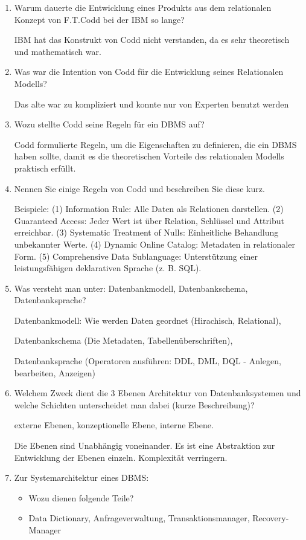 \documentclass[a4paper]{article}
\begin{document}
\begin{enumerate}
    Im Netzwerkmodell wurden Beziehungen explizit durch Zeiger/Links zwischen Datensätzen realisiert, so dass komplexere Verknüpfungen als nur Baumstrukturen möglich waren.
    \item Warum dauerte die Entwicklung eines Produkts aus dem relationalen Konzept von F.T.Codd bei der IBM so lange?
    
    IBM hat das Konstrukt von Codd nicht verstanden, da es sehr theoretisch und mathematisch war.
    \item Was war die Intention von Codd für die Entwicklung seines Relationalen Modells?
    
    Das alte war zu kompliziert und konnte nur von Experten benutzt werden
    \item Wozu stellte Codd seine Regeln für ein DBMS auf?
    
    Codd formulierte Regeln, um die Eigenschaften zu definieren, die ein DBMS haben sollte, damit es die theoretischen Vorteile des relationalen Modells praktisch erfüllt.
    \item Nennen Sie einige Regeln von Codd und beschreiben Sie diese kurz.
    
    Beispiele: (1) Information Rule: Alle Daten als Relationen darstellen. (2) Guaranteed Access: Jeder Wert ist über Relation, Schlüssel und Attribut erreichbar. (3) Systematic Treatment of Nulls: Einheitliche Behandlung unbekannter Werte. (4) Dynamic Online Catalog: Metadaten in relationaler Form. (5) Comprehensive Data Sublanguage: Unterstützung einer leistungsfähigen deklarativen Sprache (z. B. SQL).
    \item Was versteht man unter: Datenbankmodell, Datenbankschema, Datenbanksprache?
    
    Datenbankmodell: Wie werden Daten geordnet (Hirachisch, Relational), 
    
    Datenbankschema (Die Metadaten, Tabellenüberschriften), 
    
    Datenbanksprache (Operatoren ausführen: DDL, DML, DQL - Anlegen, bearbeiten, Anzeigen)
    \item Welchem Zweck dient die 3 Ebenen Architektur von Datenbanksystemen und welche Schichten unterscheidet man dabei (kurze Beschreibung)?
    
    externe Ebenen, konzeptionelle Ebene, interne Ebene. 
    
    Die Ebenen sind Unabhängig voneinander. Es ist eine Abstraktion zur Entwicklung der Ebenen einzeln. Komplexität verringern.

    \newpage
    \item Zur Systemarchitektur eines DBMS:
    \begin{itemize}
        \item Wozu dienen folgende Teile?
        \item Data Dictionary, Anfrageverwaltung, Transaktionsmanager, Recovery-Manager
    \end{itemize}
    

\end{enumerate}
\end{document}
